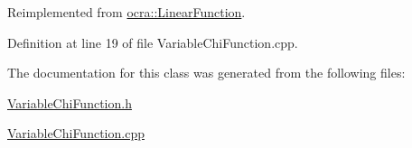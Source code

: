Reimplemented from \hyperlink{classocra_1_1LinearFunction_ac6bdf62ad6634397778d5f4223ed6d82}{ocra\+::\+Linear\+Function}.



Definition at line 19 of file Variable\+Chi\+Function.\+cpp.



The documentation for this class was generated from the following files\+:\begin{DoxyCompactItemize}
\item 
\hyperlink{VariableChiFunction_8h}{Variable\+Chi\+Function.\+h}\item 
\hyperlink{VariableChiFunction_8cpp}{Variable\+Chi\+Function.\+cpp}\end{DoxyCompactItemize}
